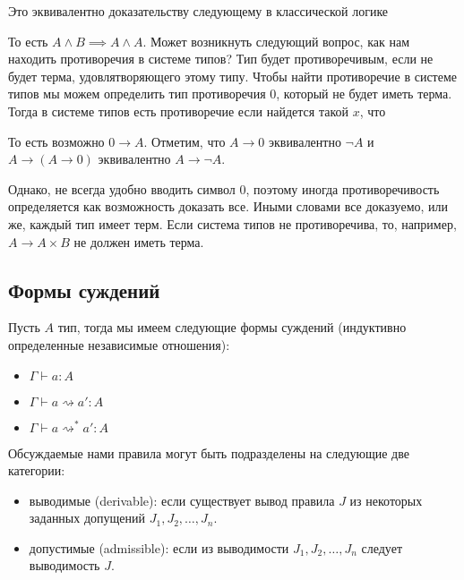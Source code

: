 \documentclass[openany]{book}
\theoremstyle{plain}
\theoremstyle{definition}
\begin{document}
Это эквивалентно доказательству следующему в классической логике

\begin{prooftree}
\end{prooftree}

То есть \(A \land B \implies A \land A\). Может возникнуть следующий вопрос, как нам находить противоречия в системе типов? Тип будет противоречивым, если не будет терма, удовлятворяющего этому типу. Чтобы найти противоречие в системе типов мы можем определить тип противоречия \(0\), который не будет иметь терма. Тогда в системе типов есть противоречие если найдется такой \(x\), что
\begin{prooftree}
\end{prooftree}

То есть возможно \(0 \to A\). Отметим, что \(A \to 0\) эквивалентно \(\neg A\) и \(A \to (A \to 0)\) эквивалентно \(A \to \neg A\).

Однако, не всегда удобно вводить символ \(0\), поэтому иногда противоречивость определяется как возможность доказать все. Иными словами все доказуемо, или же, каждый тип имеет терм. Если система типов не противоречива, то, например, \(A \to A \times B\) не должен иметь терма.

\subsection{Формы суждений}

Пусть \(A\) тип, тогда мы имеем следующие формы суждений (индуктивно определенные независимые отношения):
\begin{itemize}
    \item \(\Gamma \vdash a:A\)
    \item \(\Gamma \vdash a \rightsquigarrow a':A\)
    \item \(\Gamma \vdash a \rightsquigarrow^* a':A\)
\end{itemize}

Обсуждаемые нами правила могут быть подразделены на следующие две категории:

\begin{itemize}
    \item выводимые (derivable): если существует вывод правила \(J\) из некоторых заданных допущений \(J_1, J_2, \dots, J_n\).
    \item допустимые (admissible): если из выводимости \(J_1, J_2, \dots, J_n\) следует выводимость \(J\).
\end{itemize}
\end{document}
